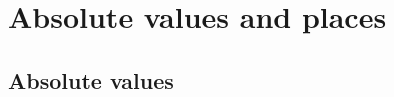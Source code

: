 \def\module{Algebraic Number Theory}
\def\lecturer{Professor Anthony Scholl}
\def\term{Lent 2020}
\def\cover{}
\def\syllabus{}
\def\thm{section}



\newcommand{\1}{\mathbbm{1}}
\newcommand{\dA}{\dif_\AA}
\newcommand{\dF}{\dif_F}
\newcommand{\dJ}{\dif_\JJ}
\newcommand{\dJI}{\dif_{\JJ^1}}
\newcommand{\dv}{\dif_v}
\newcommand{\hathat}[1]{\widehat{\widehat{#1\ }}\!\!}
\newcommand{\intA}[3][]{\int_{\ifstrempty{#1}{\AA_K}{#1}} #2 \, \dA #3}
\newcommand{\intF}[3][]{\int_{\ifstrempty{#1}{F}{#1}} #2 \, \dF #3}
\newcommand{\intFX}[3][]{\int_{\ifstrempty{#1}{F^\times}{#1}} #2 \, \dF^\times #3}
\newcommand{\intJ}[3][]{\int_{\ifstrempty{#1}{\JJ_K}{#1}} #2 \, \dJ #3}
\newcommand{\intJI}[3][]{\int_{\ifstrempty{#1}{\JJ_K^1}{#1}} #2 \, \dJI #3}
\newcommand{\intv}[3][]{\int_{\ifstrempty{#1}{K_v}{#1}} #2 \, \dv #3}
\newcommand{\intvX}[3][]{\int_{\ifstrempty{#1}{K_v^\times}{#1}} #2 \, \dv^\times #3}
\newcommand{\mods}{\mod\!\!^*\ }
\newcommand{\twobytwosmall}[4]{
  \begin{psmallmatrix}
    #1 & #2 \\
    #3 & #4
  \end{psmallmatrix}
}





\setcounter{section}{0}

\section{Absolute values and places}

\subsection{Absolute values}


